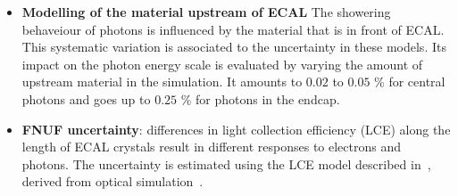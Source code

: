 \begin{itemize}
    \item \textbf{Modelling of the material upstream of ECAL} The showering behaveiour of photons is influenced by the material that is in front of ECAL. This systematic variation is associated to the uncertainty in these models. Its impact on the photon energy scale is evaluated by varying the amount of upstream material in the simulation. It amounts to $0.02$ to $0.05$ \% for central photons and goes up to $0.25$ \% for photons in the endcap.
\end{itemize}
\begin{itemize}
    \item \textbf{FNUF uncertainty}: differences in light collection efficiency (LCE) along the length of ECAL crystals result in different responses to electrons and photons. The uncertainty is estimated using the LCE model described in~\cite{Adams:2016viv}, derived from optical simulation~\cite{Gentit:2001ky}.
\end{itemize}


